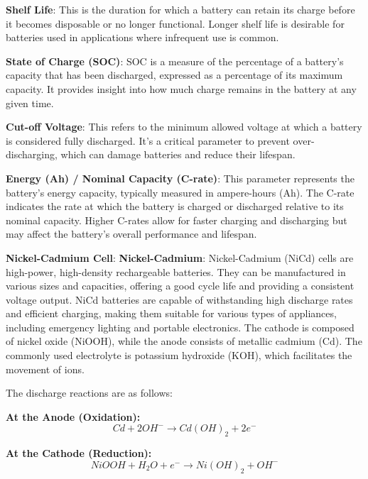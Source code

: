 \documentclass{article}
\begin{document}
\begin{flushleft}
\textbf{Shelf Life}: This is the duration for which a battery can retain its charge before it becomes disposable or no longer functional. Longer shelf life is desirable for batteries used in applications where infrequent use is common. \newline

\textbf{State of Charge (SOC)}: SOC is a measure of the percentage of a battery's capacity that has been discharged, expressed as a percentage of its maximum capacity. It provides insight into how much charge remains in the battery at any given time.\newline

\textbf{Cut-off Voltage}: This refers to the minimum allowed voltage at which a battery is considered fully discharged. It's a critical parameter to prevent over-discharging, which can damage batteries and reduce their lifespan. \newline

\textbf{Energy (Ah) / Nominal Capacity (C-rate)}: This parameter represents the battery's energy capacity, typically measured in ampere-hours (Ah). The C-rate indicates the rate at which the battery is charged or discharged relative to its nominal capacity. Higher C-rates allow for faster charging and discharging but may affect the battery's overall performance and lifespan. \newline
\vspace*{3pt}

\textbf{Nickel-Cadmium Cell}: \textbf{Nickel-Cadmium}: Nickel-Cadmium (NiCd) cells are high-power, high-density rechargeable batteries. They can be manufactured in various sizes and capacities, offering a good cycle life and providing a consistent voltage output. NiCd batteries are capable of withstanding high discharge rates and efficient charging, making them suitable for various types of appliances, including emergency lighting and portable electronics. The cathode is composed of nickel oxide (NiOOH), while the anode consists of metallic cadmium (Cd). The commonly used electrolyte is potassium hydroxide (KOH), which facilitates the movement of ions.

The discharge reactions are as follows:

\textbf{At the Anode (Oxidation):}
\begin{equation*}
    Cd + 2OH^- \rightarrow Cd(OH)_2 + 2e^-
\end{equation*}

\textbf{At the Cathode (Reduction):}
\begin{equation*}
    NiOOH + H_2O + e^- \rightarrow Ni(OH)_2 + OH^-
\end{equation*}


\end{flushleft}
\end{document}
